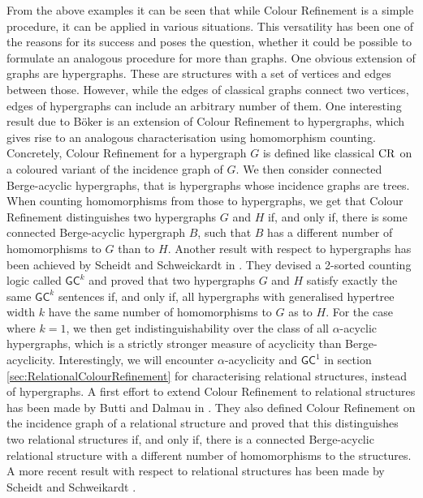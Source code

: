 From the above examples it can be seen that while Colour Refinement is a simple procedure, it can be applied in various situations.
This versatility has been one of the reasons for its success and poses the question, whether it could be possible to formulate an analogous procedure for more than graphs.
One obvious extension of graphs are hypergraphs.
These are structures with a set of vertices and edges between those.
However, while the edges of classical graphs connect two vertices, edges of hypergraphs can include an arbitrary number of them.
One interesting result due to Böker \cite{boker2019ColorRefinement} is an extension of Colour Refinement to hypergraphs, which gives rise to an analogous characterisation using homomorphism counting.
Concretely, Colour Refinement for a hypergraph $G$ is defined like classical $\operatorname{CR}$ on a coloured variant of the incidence graph of $G$.
We then consider connected Berge-acyclic hypergraphs, that is hypergraphs whose incidence graphs are trees. 
When counting homomorphisms from those to hypergraphs, we get that Colour Refinement distinguishes two hypergraphs $G$ and $H$ if, and only if, there is some connected Berge-acyclic hypergraph $B$, such that $B$ has a different number of homomorphisms to $G$ than to $H$.
Another result with respect to hypergraphs has been achieved by Scheidt and Schweickardt in \cite{scheidt2023CountingHomomorphisms}.
They devised a 2-sorted counting logic called $\mathsf{GC}^k$ and proved that two hypergraphs $G$ and $H$ satisfy exactly the same $\mathsf{GC}^k$ sentences if, and only if, all hypergraphs with generalised hypertree width $k$ have the same number of homomorphisms to $G$ as to $H$.
For the case where $k=1$, we then get indistinguishability over the class of all $\alpha$-acyclic hypergraphs, which is a strictly stronger measure of acyclicity than Berge-acyclicity.
Interestingly, we will encounter $\alpha$-acyclicity and $\mathsf{GC}^1$ in section \ref{sec:RelationalColourRefinement} for characterising relational structures, instead of hypergraphs.
A first effort to extend Colour Refinement to relational structures has been made by Butti and Dalmau in \cite{butti2021FractionalHomomorphism}.
They also defined Colour Refinement on the incidence graph of a relational structure and proved that this distinguishes two relational structures if, and only if, there is a connected Berge-acyclic relational structure with a different number of homomorphisms to the structures.
A more recent result with respect to relational structures has been made by Scheidt and Schweikardt \cite{scheidt2025ColorRefinement}.
